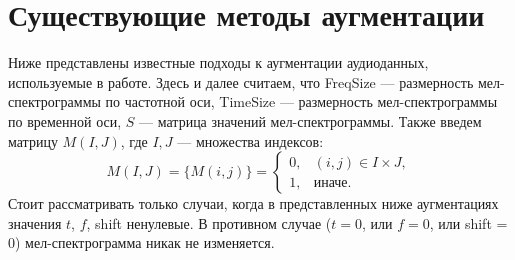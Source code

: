\documentclass[12pt, fleqn]{article}
\begin{document}
\section{Существующие методы аугментации}
Ниже представлены известные подходы к аугментации аудиоданных, используемые в работе. 	
\newline Здесь и далее считаем, что \newline FreqSize --- размерность мел-спектрограммы по частотной оси, \newline TimeSize --- размерность мел-спектрограммы по временной оси, \newline
$S$ --- матрица значений мел-спектрограммы. \newline
Также введем матрицу $M(I, J)$, где $I, J$ --- множества индексов: \newline 
\begin{equation*}
M(I, J) = \{M(i, j)\} = 
\begin{cases}
0, & (i,j) \in I \times J,\\
1, &\text{иначе}.
\end{cases}
\end{equation*}
Стоит рассматривать только случаи, когда в представленных ниже аугментациях значения $t$, $f$, shift ненулевые. В противном случае ($t = 0$, или $f = 0$, или shift = 0) мел-спектрограмма никак не изменяется.
\end{document}
